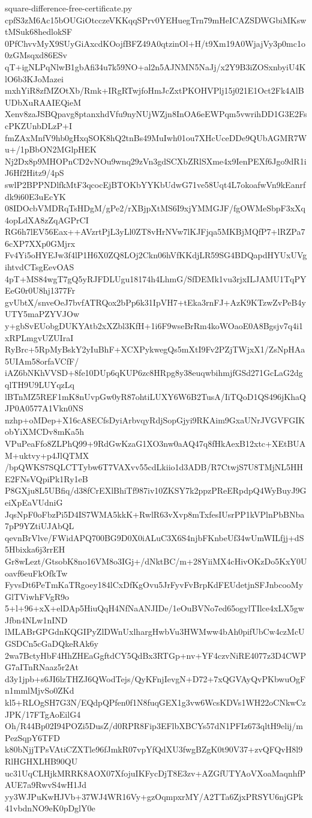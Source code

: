 \documentclass[11pt]{article}
\theoremstyle{definition}
\theoremstyle{remark}
\begin{document}
\begin{filecontents*}[overwrite]{square-difference-free-certificate.py}
cpfS3zM6Ac15bOUGiOtcczeVKKqqSPrv0YEHuegTrn79mHeICAZSDWGbiMKswtMSuk68hedlokSF
0PfChvvMyX9SUyGiAxcdKOojfBFZ49A0qtzinOl+H/t9Xm19A0WjajVy3p0mc1o0zGMsqxd86ESv
qT+igNLPqNlwB1gbAfi34u7k59NO+al2n5AJNMN5NaJj/x2Y9B3iZOSxnbyiU4KlO6b3KJoMazei
mxhYiR8zfMZOtXb/Rmk+IRgRTwjfoHmJcZxtPKOHVPlj15j021E1Oct2Fk4AlBUDbXuRAAIEQieM
Xenv8zaJSBQpavg8ptanxhdVfu9nyNUjWZjn8InOA6eEWPqm5vwrihDD1G3E2FscPKZUnbDLzP+I
fmZAxMnfV9hb0gHxqSOK8hQ2tnBs49MuIwh01ou7XHcUceDDe9QUbAGMR7Wu+/1pBbON2MGlpHEK
Nj2Dx8p9MHOPnCD2vNOu9wnq29zVn3gdSCXbZRlSXme4x9IenPEXf6Jgo9dR1iJ6Hf2Hitz9/4pS
swlP2BPPNDlfkMtF3qcocEjBTOKbYYKbUdwG71ve58Uqt4L7okoafwVn9kEanrfdk9i60E3uEcYK
08IDOcbVMDRqTsHDgM/gPe2/rXBjpXtMS6I9xjYMMGJF/fgOWMeSbpF3xXq4opLdXA8zZqAGPrCI
RG6h7lEV56Eax++AVzrtPjL3yLl0ZT8vHrNVw7lKJFjqa5MKBjMQfP7+lRZPa76cXP7XXp0GMjrx
Fv4Yi5oHYEJw3f4lP1H6X0ZQ8LOj2Ckn06hVfKKdjLR59SG4BDQapdHYUxUVgihtvdCTsgEevOAS
4pT+MS84wgT7gQ5yRJFDLUgu18174h4LhmG/SfDEMk1vu3rjxILJAMU1TqPYEeG0r0U8hj1377Fr
gvUbtX/snveOeJ7bvfATRQox2bPp6k31IpVH7+tEka3rnFJ+AzK9KTzwZvPeB4yUTY5maPZYVJOw
y+gbSvEUobgDUKYAtb2xXZbl3KfH+1i6F9wseBrRm4koWOaoE0A8Bgsjv7q4i1xRPLmgvUZUIraI
RyBrc+5RpMyBskY2yIuBhF+XCXPykwegQs5mXtI9Fv2PZjTWjxX1/ZsNpHAa5UIAm58orfaVCfF/
iAZ6bNKhVVSD+8fe10DUp6qKUP6zc8HRpg8y38euqwbihmjfGSd271GcLaG2dgqlTH9U9LUYqzLq
lBTnMZ5REF1mK8nUvpGw0yR87ohtiLUXY6W6B2TusA/IiTQoD1QS496jKhaQJP0A0577A1Vkn0NS
nzhp+oMDep+X16cA8ECfsDyiArbvqyRdjSopGjyi9RKAim9GxaUNrJVGVFGIKobYiXMCDv8mKa5h
VPuPeaFfo8ZLPhQ99+9RdGwKzaG1XO3nw0aAQ47q8fHkAexB12xtc+XEtBUAM+uktvy+p4JlQTMX
/bpQWKS7SQLCTTybw6T7VAXvv55cdLkiio1d3ADB/R7CtwjS7U8TMjNL5HHE2FNsVQpiPk1Ry1eB
P8GXju8L5UBfiq/d38fCrEXlBhiTf987iv10ZKSY7k2ppzPReERpdpQ4WyBuyJ9GeiXpEaVUdniG
JqsNpF0oFbzPi5D4IS7WMA5kkK+RwlR63vXvp8mTxfesIUsrPP1kVPlnPbBNba7pP9YZtiUJAbQL
qevnBrVlve/FWidAPQ700BG9D0X0iALuC3X6S4njbFKnbeUf34wUmWILfjj+dS5Hbixka6j3rrEH
Gr8wLezt/GtsobK8no16VM8o3IGj+/dNktBC/m+28YiiMX4cHivOKzDo5KxY0Uoavf6euFkOfkTw
FyvsDt6PeTmKaTRgoey184lCxDfKgOvu5JrFyvFvBrpKdFEUdetjnSFJnbcooMyGlTViwhFVgR9o
5+l+96+xX+elDAp5HiuQqH4NfNaANJIDe/1eOuBVNo7ed65ogylTIlce4xLX5gwJfbn4NLw1nIND
lMLABrGPGdnKQGIPyZlDWnUxlhargHwbVu3HWMww4bAh0pifUbCw4czMcUGSDCn5cGaDQkeRAk6y
2wa7BctyHbF4HhZHEaGgftdCY5QdBx3RTGp+nv+YF4czvNiRE4077z3D4CWPG7aITnRNaaz5r2At
d3y1jpb+s6JI6lzTHZJ6QWodTejs/QyKFnjIevgN+D72+7xQGVAyQvPKbwuOgFn1mmlMjvSo0ZKd
kl5+RLOgSH7G3N/EQdpQPfen0f1N8fuqGEX1g3vw6WcsKDVs1WH22oCNkwCzJPK/17FTgAoEilG4
Oh/R44Bp02I94POZi5DusZ/d0RPR8Fip3EFlbXBCYs57dN1PFIz673qltH9elij/mPezSqpY6TFD
k80bNjjTPsVAtiCZXTle96fJmkR07vpYfQdXU3fwgBZgK0t90V37+zvQFQvH8l9RlHGHXLHB90QU
uc31UqCLHjkMRRK8AOX07XfojuIKFycDjT8E3zv+AZGfUTYAoVXoaMaqnhfPAUE7a9RwvS4wH1Jd
yy3WJPuKwHJVb+37WJ4WR16Vy+gzOqmpxrMY/A2TTa6ZjxPRSYU6njGPk41vbdnNO9eK0pDglY0e

\end{filecontents*}
\end{document}
